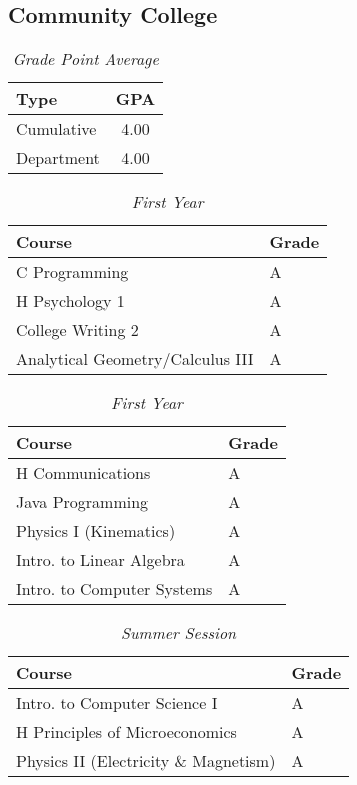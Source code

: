 \documentclass[11pt]{article}
\renewcommand{\it}[1]{\textit{{#1}}}
\begin{document}
\subsection{Community College}
\begin{table}[H]
    \centering
    \caption*{\it{Grade Point Average}}
    \vspace{-0.8em}
    \begin{tabular}{l|c}
        Type     & GPA  \\
        \hline
        Cumulative & 4.00 \\
        Department & 4.00 \\
    \end{tabular}
    \vspace{-1em}
\end{table}
\begin{table}[H]
    \centering
    \caption*{\it{First Year}}
    \vspace{-0.8em}
    \begin{tabular}{l|l}
        Course                               & Grade \\
        \hline
        C Programming                        & A \\
        H Psychology 1                       & A \\
        College Writing 2                    & A \\
        Analytical Geometry/Calculus III     & A \\
    \end{tabular}
    \hfill
    \begin{tabular}{l|l}
        Course                           & Grade \\
        \hline
        H Communications                 & A \\
        Java Programming                 & A \\
        Physics I (Kinematics)           & A \\
        Intro. to Linear Algebra         & A \\
        Intro. to Computer Systems       & A \\
    \end{tabular}
    \vspace{-1em}
\end{table}

\begin{table}[H]
    \centering
    \vspace{-0.8em}
    \caption*{\it{Summer Session}}
    \begin{tabular}{l|l}
        Course                                 & Grade \\
        \hline
        Intro. to Computer Science I           & A \\
        H Principles of Microeconomics         & A \\
        Physics II (Electricity \& Magnetism)  & A \\
    \end{tabular}
    \vspace{-1em}
\end{table}
\end{document}
